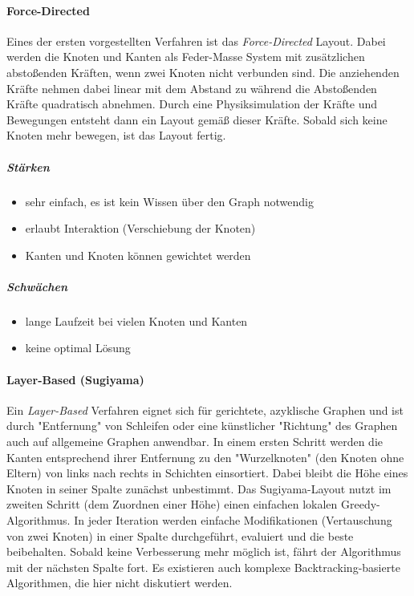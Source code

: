 \paragraph{Force-Directed}
Eines der ersten vorgestellten Verfahren ist das \emph{Force-Directed} Layout. Dabei werden die Knoten und Kanten als Feder-Masse System mit zusätzlichen abstoßenden Kräften, wenn zwei Knoten nicht verbunden sind. Die anziehenden Kräfte nehmen dabei linear mit dem Abstand zu während die Abstoßenden Kräfte quadratisch abnehmen. Durch eine Physiksimulation der Kräfte und Bewegungen entsteht dann ein Layout gemäß dieser Kräfte. Sobald sich keine Knoten mehr bewegen, ist das Layout fertig.

\subparagraph{Stärken}
\begin{itemize}
	\item sehr einfach, es ist kein Wissen über den Graph notwendig
	\item erlaubt Interaktion (\zB Verschiebung der Knoten)
	\item Kanten und Knoten können gewichtet werden
\end{itemize}

\subparagraph{Schwächen}
	\begin{itemize}
		\item lange Laufzeit bei vielen Knoten und Kanten
		\item keine optimal Lösung
	\end{itemize}

\paragraph{Layer-Based (Sugiyama)}
	Ein \emph{Layer-Based} Verfahren eignet sich für gerichtete, azyklische Graphen und ist durch "Entfernung" von Schleifen oder eine künstlicher "Richtung" des Graphen auch auf allgemeine Graphen anwendbar. In einem ersten Schritt werden die Kanten entsprechend ihrer Entfernung zu den "Wurzelknoten" (den Knoten ohne Eltern) von links nach rechts in Schichten einsortiert. Dabei bleibt die Höhe eines Knoten in seiner Spalte zunächst unbestimmt. Das Sugiyama-Layout nutzt im zweiten Schritt (dem Zuordnen einer Höhe) einen einfachen lokalen Greedy-Algorithmus. In jeder Iteration werden einfache Modifikationen (\zB Vertauschung von zwei Knoten) in einer Spalte durchgeführt, evaluiert und die beste beibehalten. Sobald keine Verbesserung mehr möglich ist, fährt der Algorithmus mit der nächsten Spalte fort. Es existieren auch komplexe Backtracking-basierte Algorithmen, die hier nicht diskutiert werden.


